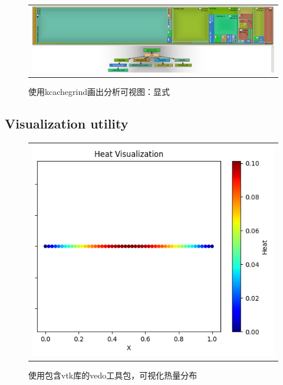 \documentclass[3p]{elsarticle}
\numberwithin{equation}{section}
\begin{document}
    \begin{figure}[h]
    	\begin{center}
    		\begin{tabular}{c}    			
    			\includegraphics[angle=0, scale=0.35]{./figures/callgrind1.png}
    		\end{tabular}
    	\end{center}
    	\caption{使用kcachegrind画出分析可视图：显式}
    	\label{fig:illustration-callgrind1}
    \end{figure} 
	
	\clearpage
	
	\subsection{Visualization utility}
	
	
	\begin{figure}[h]
		\begin{center}
			\begin{tabular}{c}
				\includegraphics[angle=0, scale=0.6]{./figures/visualization.png}
			\end{tabular}
		\end{center}
		\caption{使用包含vtk库的vedo工具包，可视化热量分布}
		\label{fig:illustration-visualization}
	\end{figure}
\end{document}
